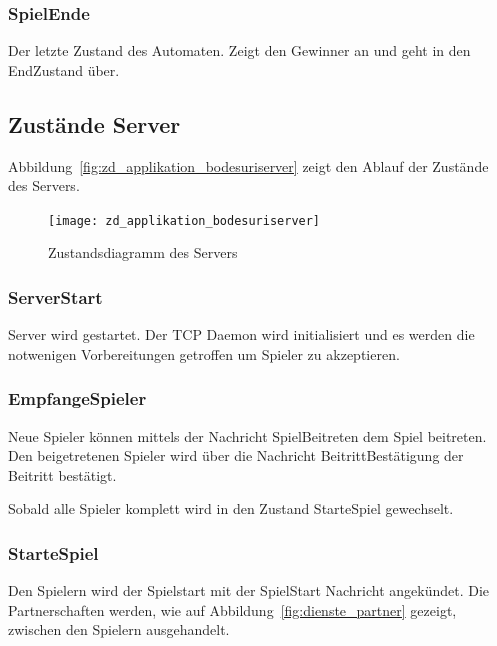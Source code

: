 \documentclass[12pt,halfparskip]{scrartcl}
\begin{document}
\subsubsection{SpielEnde} %
\label{ssub:spielende}
Der letzte Zustand des Automaten. Zeigt den Gewinner an und geht in den EndZustand über.

\subsection{Zustände Server} %
\label{sub:zustände_server}

Abbildung~\vref{fig:zd_applikation_bodesuriserver} zeigt den Ablauf der Zustände des Servers.

\begin{figure}[h]
	\centering
	\texttt{[image: zd\_applikation\_bodesuriserver]}
	\caption{Zustandsdiagramm des Servers}
	\label{fig:zd_applikation_bodesuriserver}
\end{figure}

\subsubsection{ServerStart} %
\label{ssub:serverStart}
Server wird gestartet. Der TCP Daemon wird initialisiert und es werden die notwenigen Vorbereitungen getroffen um Spieler zu akzeptieren.


\subsubsection{EmpfangeSpieler} %
\label{ssub:empfangespieler}
Neue Spieler können mittels der Nachricht SpielBeitreten dem Spiel beitreten. Den beigetretenen Spieler wird über die Nachricht BeitrittBestätigung der Beitritt bestätigt.

Sobald alle Spieler komplett wird in den Zustand StarteSpiel gewechselt.


\subsubsection{StarteSpiel} %
\label{ssub:startespiel}
Den Spielern wird der Spielstart mit der SpielStart Nachricht angekündet. Die Partnerschaften werden, wie auf Abbildung~\vref{fig:dienste_partner} gezeigt, zwischen den Spielern ausgehandelt.
\end{document}
